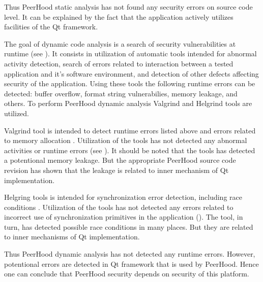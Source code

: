 %
Thus PeerHood static analysis has not found any security errors on source code level. 
%
It can be explained by the fact that the application actively utilizes facilities of the Qt framework. 



%
The goal of dynamic code analysis is a search of security vulnerabilities at runtime (see ). 
%
It consists in utilization of automatic tools intended for abnormal activity detection, search of errors related to interaction between a tested application and it's software environment, and detection of other defects affecting security of the application. 
%
Using these tools the following runtime errors can be detected: buffer overflow, format string vulnerabilies, memory leakage, and others. 
%
To perform PeerHood dynamic analysis Valgrind and Helgrind tools are utilized. 

%
Valgrind tool is intended to detect runtime errors listed above and errors related to memory allocation . 
%
Utilization of the tools has not detected any abnormal activities or runtime errors (see ). 
%
It should be noted that the tools has detected a potentional memory leakage. 
%
But the appropriate PeerHood source code revision has shown that the leakage is related to inner mechanism of Qt implementation. 

%
Helgring tools is intended for synchronization error detection, including race conditions . 
%
Utilization of the tools has not detected any errors related to incorrect use of synchronization primitives in the application (). 
%
The tool, in turn, has detected possible race conditions in many places. 
%
But they are related to inner mechanisms of Qt implementation. 

%
Thus PeerHood dynamic analysis has not detected any runtime errors. 
%
However, potentional errors are detected in Qt framework that is used by PeerHood. 
%
Hence one can conclude that PeerHood security depends on security of this platform. 


